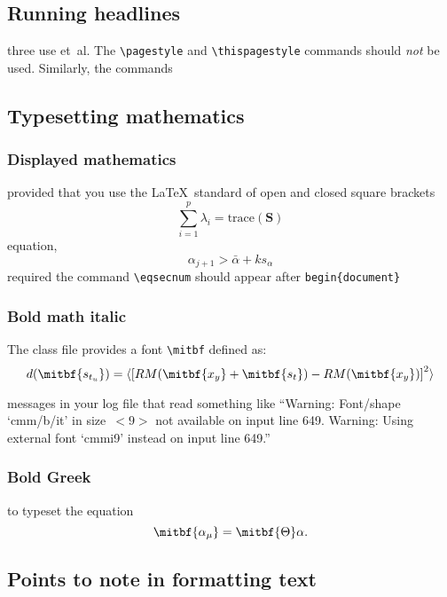 \subsection{Running headlines}

three use et~al. The \verb"\pagestyle" and \verb"\thispagestyle"
commands should {\em not\/} be used. Similarly, the commands

\subsection{Typesetting mathematics}

\subsubsection{Displayed mathematics}

provided that you use the \LaTeX\ standard of open and closed square brackets
\[
 \sum_{i=1}^p \lambda_i =
{\mathrm{trace}}(\mathbf{S})
\]
equation, \[ \alpha_{j+1} > \bar{\alpha}+ks_{\alpha} \]
required the command \verb"\eqsecnum" should appear after \verb"begin{document}"

\subsubsection{Bold math italic}\label{boldmathitalic}

The class file provides a font \verb"\mitbf" defined as:
\begin{equation}
  d(\mitbf{s_{t_u}}) = \langle {[RM(\mitbf{x_y} + \mitbf{s_t}) - RM(\mitbf{x_y})]}^2 \rangle
\end{equation}

messages in your log file that read something like ``Warning: Font/shape
`cmm/b/it' in size~\hbox{$< \!\! 9 \!\! >$} not available on input line 649.
Warning: Using external font `cmmi9' instead on input line 649.''


\subsubsection{Bold Greek}\label{boldgreek}

to typeset the equation \[ \mitbf{{\alpha_{\mu}}} = \mitbf{\Theta} \alpha. \]

\subsection{Points to note in formatting text}\label{formtext}


